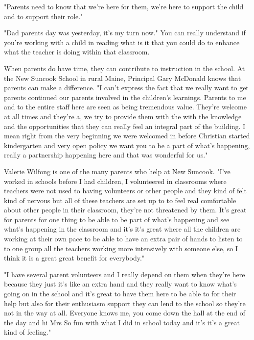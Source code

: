 "Parents need to know that we're here for them, we're here to support the child and to support their role."

"Dad parents day was yesterday, it's my turn now." You can really understand if you're working with a child in reading what is it that you could do to enhance what the teacher is doing within that classroom.

When parents do have time, they can contribute to instruction in the school.
At the New Suncook School in rural Maine, Principal Gary McDonald knows that parents can make a difference.
"I can't express the fact that we really want to get parents continued our parents involved in the children's learnings.
Parents to me and to the entire staff here are seen as being tremendous value.
They're welcome at all times and they're a, we try to provide them with the with the knowledge and the opportunities that they can really feel an integral part of the building.
I mean right from the very beginning we were welcomed in before Christian started kindergarten and very open policy we want you to be a part of what's happening, really a partnership happening here and that was wonderful for us."

Valerie Wilfong is one of the many parents who help at New Suncook.
"I've worked in schools before I had children, I volunteered in classrooms where teachers were not used to having volunteers or other people and they kind of felt kind of nervous but all of these teachers are set up to to feel real comfortable about other people in their classroom, they're not threatened by them.
It's great for parents for one thing to be able to be part of what's happening and see what's happening in the classroom and it's it's great where all the children are working at their own pace to be able to have an extra pair of hands to listen to to one group all the teachers working more intensively with someone else, so I think it is a great great benefit for everybody."

"I have several parent volunteers and I really depend on them when they're here because they just it's like an extra hand and they really want to know what's going on in the school and it's great to have them here to be able to for their help but also for their enthusiasm support they can lend to the school so they're not in the way at all.
Everyone knows me, you come down the hall at the end of the day and hi Mrs So fun with what I did in school today and it's it's a great kind of feeling."

